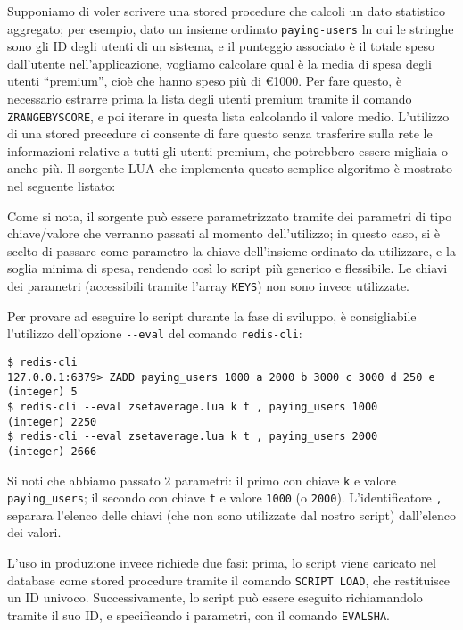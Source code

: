Supponiamo di voler scrivere una stored procedure che calcoli un dato statistico aggregato; per
esempio, dato un insieme ordinato \verb|paying-users| ln cui le stringhe sono gli ID degli utenti
di un sistema, e il punteggio associato è il totale speso dall'utente nell'applicazione, vogliamo
calcolare qual è la media di spesa degli utenti ``premium'', cioè che hanno speso più di €1000. 
Per fare questo, è necessario estrarre prima la lista degli utenti premium tramite il comando
\verb|ZRANGEBYSCORE|, e poi iterare in questa lista calcolando il valore medio. L'utilizzo di una
stored precedure ci consente di fare questo senza trasferire sulla rete le informazioni relative
a tutti gli utenti premium, che potrebbero essere migliaia o anche più. Il sorgente LUA che
implementa questo semplice algoritmo è mostrato nel seguente listato:

\medskip


Come si nota, il sorgente può essere parametrizzato tramite dei parametri di tipo chiave/valore
che verranno passati al momento dell'utilizzo; in questo caso, si è scelto di passare come parametro 
la chiave dell'insieme ordinato da utilizzare, e la soglia minima di spesa, rendendo così lo script 
più generico e flessibile. Le chiavi dei parametri (accessibili tramite l'array \verb|KEYS|) non
sono invece utilizzate.

Per provare ad eseguire lo script durante la fase di sviluppo, è consigliabile l'utilizzo
dell'opzione \verb|--eval| del comando \verb|redis-cli|:

\medskip
\begin{lstlisting}
$ redis-cli
127.0.0.1:6379> ZADD paying_users 1000 a 2000 b 3000 c 3000 d 250 e
(integer) 5
$ redis-cli --eval zsetaverage.lua k t , paying_users 1000
(integer) 2250
$ redis-cli --eval zsetaverage.lua k t , paying_users 2000
(integer) 2666
\end{lstlisting}

Si noti che abbiamo passato 2 parametri: il primo con chiave \verb|k| e valore \verb|paying_users|;
il secondo con chiave \verb|t| e valore \verb|1000| (o \verb|2000|). L'identificatore \verb|,|
separara l'elenco delle chiavi (che non sono utilizzate dal nostro script) dall'elenco dei valori.

L'uso in produzione invece richiede due fasi: prima, lo script viene caricato nel database
come stored procedure tramite il comando \verb|SCRIPT LOAD|, che restituisce un ID univoco. 
Successivamente, lo script può essere eseguito richiamandolo tramite il suo ID, e specificando 
i parametri, con il comando \verb|EVALSHA|.

